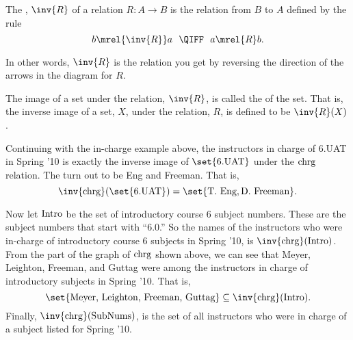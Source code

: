 \begin{definition}
The , $\inv{R}$ of a relation $R: A \to B$ is the
relation from $B$ to $A$ defined by the rule
\[
b \mrel{\inv{R}} a\ \ \QIFF\ \ a \mrel{R} b.
\]
\end{definition}
In other words, $\inv{R}$ is the relation you get by reversing the
direction of the arrows in the diagram for $R$.

\begin{definition}
The image of a set under the relation, $\inv{R}$, is called
the  of the set.  That is, the inverse image of a
set, $X$, under the relation, $R$, is defined to be $\inv{R}(X)$.
\end{definition}

Continuing with the in-charge example above, the instructors
in charge of 6.UAT in Spring '10 is exactly the inverse image of
$\set{\text{6.UAT}}$ under the $\text{chrg}$ relation.  The turn out to be Eng
and Freeman.  That is,
\[
\inv{\inchrg}(\set{\text{6.UAT}}) = \set{\text{T. Eng}, \text{D. Freeman}}.
\]

Now let $\text{Intro}$ be the set of introductory course 6 subject
numbers.  These are the subject numbers that start with ``6.0.''  So
the names of the instructors who were in-charge of introductory course 6
subjects in Spring '10, is $\inv{\inchrg}(\introsub)$.  From the part of
the graph of $\text{chrg}$ shown above, we can see that Meyer, Leighton,
Freeman, and Guttag were among the instructors in charge of introductory
subjects in Spring '10.  That is,
\[
\set{\text{Meyer, Leighton, Freeman, Guttag}} \subseteq \inv{\inchrg}(\introsub).
\]
Finally, $\inv{\inchrg}(\subnums)$, is the set of all instructors who
were in charge of a subject listed for Spring '10.

\iffalse
It gets interesting when we write composite expressions mixing images,
inverse images and set operations.  For example, $T(\inv{T}(D))$ is
the set of Spring '09 subjects that have an instructor in charge who
also is in in charge of an introductory subject.  So $T(\inv{T}(D)) -
D$ are the advanced subjects with someone in-charge who is also
in-charge of an introductory subject.  Similarly, $\inv{T}(D) \intersect
\inv{T}(N-D)$ is the set of faculty in charge of both an introductory \emph{and}
an advanced subject in Spring '09.
\fi

\begin{problems}
\practiceproblems
{}
\end{problems}


